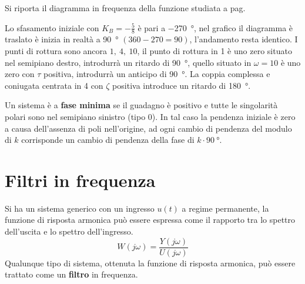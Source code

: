 \newpage
Si riporta il diagramma in frequenza della funzione studiata a pag.
\pageref{sec:Esercizio_bode}
\begin{figure}[h]
\centering
{}
\end{figure}

Lo sfasamento iniziale con $K_B=-\frac{5}{8}$ è pari a \SI{-270}{\degree}, nel
grafico il diagramma è traslato è inizia in realtà a \SI{90}{\degree}
$(360-270=90)$, l'andamento resta identico. I punti di rottura sono ancora $1,\
4,\ 10$, il punto di rottura in 1 è uno zero situato nel semipiano destro,
introdurrà un ritardo di \SI{90}{\degree}, quello situato in $\omega=10$ è uno
zero con $\tau$ positiva, introdurrà un anticipo di \SI{90}{\degree}.
La coppia complessa e coniugata centrata in 4 con $\zeta$ positiva introduce un
ritardo di \SI{180}{\degree}.

Un sistema è a \textbf{fase minima} se il guadagno è positivo e tutte le
singolarità polari sono nel semipiano sinistro (tipo 0).
In tal caso la pendenza iniziale è zero a causa dell'assenza di poli
nell'origine, ad ogni cambio di pendenza del modulo di $k$ corrisponde un
cambio di pendenza della fase di $k\cdot\SI{90}{\degree}$.


\section{Filtri in frequenza}
Si ha un sistema generico con un ingresso $u(t)$ a regime permanente, la
funzione di risposta armonica può essere espressa come il rapporto tra lo
spettro dell'uscita e lo spettro dell'ingresso.
$$
W(j\omega) = \frac{Y(j\omega)}{U(j\omega)}
$$
Qualunque tipo di sistema, ottenuta la funzione di risposta armonica, può
essere trattato come un \textbf{filtro} in frequenza.


